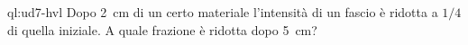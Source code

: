 \begin{quesitolampo}{ql:ud7-hvl}
Dopo \SI{2}{\centi\metre} di un certo materiale l'intensità di un fascio è ridotta a $1/4$ di quella iniziale. A quale frazione è ridotta dopo \SI{5}{\centi\metre}?
\end{quesitolampo}

